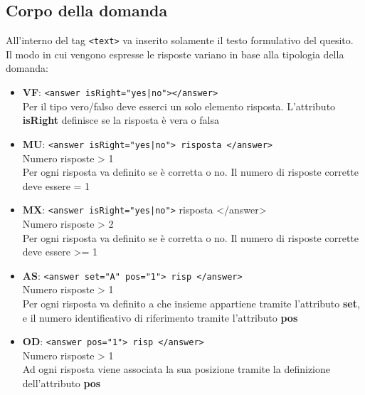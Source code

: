 \documentclass[a4paper,11pt]{article}
\newcommand{\code}[1]{\texttt{#1}}
\begin{document}
\subsection{Corpo della domanda}
All'interno del tag \code{<text>} va inserito solamente il testo formulativo del quesito.\\
Il modo in cui vengono espresse le risposte variano in base alla tipologia della domanda:
\begin{itemize}
\item \textbf{VF}: \code{<answer isRight="yes|no"></answer>}\\ Per il tipo vero/falso deve esserci un solo elemento risposta. 	L'attributo \textbf{isRight} definisce se la risposta è vera o falsa\\
\item \textbf{MU}: \code{<answer isRight="yes|no"> risposta </answer>}\\
Numero risposte > 1\\
Per ogni risposta va definito se è corretta o no. Il numero di risposte corrette deve essere = 1\\
\item \textbf{MX}: \code{<answer isRight="yes|no">} risposta </answer>\\
Numero risposte > 2\\
Per ogni risposta va definito se è corretta o no. Il numero di risposte corrette deve essere >= 1\\
\item \textbf{AS}: \code{<answer set="A" pos="1"> risp </answer>}\\
Numero risposte > 1\\
Per ogni risposta va definito a che insieme appartiene tramite l'attributo \textbf{set}, e il numero identificativo di riferimento tramite l'attributo \textbf{pos}\\
\item \textbf{OD}: \code{<answer pos="1"> risp </answer>}\\
Numero risposte > 1\\
Ad ogni risposta viene associata la sua posizione tramite la definizione dell'attributo \textbf{pos}
\end{itemize}

\newpage
\end{document}
